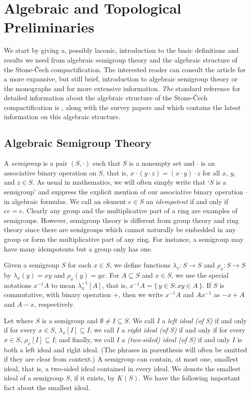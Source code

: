 \documentclass[12pt]{article}
\theoremstyle{plain}
\theoremstyle{definition}
\begin{document}
\section{Algebraic and Topological Preliminaries}
We start by giving a, possibly laconic, introduction to the basic
definitions and results we need from algebraic semigroup theory and the
algebraic structure of the Stone-\v{C}ech compactification.
The interested reader can consult the article \cite{Hollings:2007uq}
for a more expansive, but still brief, introduction to algebraic
semigroup theory or the monographs \cite{Clifford:1961fk} and
\cite{Clifford:1967fk} for more extensive information.
\textsl{The} standard reference for detailed information about the
algebraic structure of the Stone-\v{C}ech compactification is
\cite{Hindman:1998fk}, along with the survey papers \cite{Hindman:2002kx} and
\cite{Hindman:2010uq} which contains the latest information on this
algebraic structure. 

\subsection{Algebraic Semigroup Theory}
A \textsl{semigroup} is a pair $(S, \cdot)$ such that $S$ is a
nonempty set
and $\cdot$ is an associative binary operation on $S$, that is, $x \cdot
(y \cdot z) = (x \cdot y) \cdot z$ for all $x$, $y$, and $z \in S$.
As usual in mathematics, we will often simply write that `$S$ is a
semigroup' and suppress the explicit mention
of our associative binary operation $\cdot$ in algebraic formulas. 
We call an element $e \in S$ an \textsl{idempotent} if and only if $ee
= e$. 
Clearly any group and the multiplicative part of a ring are examples
of semigroups.
However, semigroup theory is different from group theory and ring
theory since there are semigroups which cannot naturally be embedded
in any group or form the multiplicative part of any ring.
For instance, a semigroup may have many idempotents but a group only
has one.

Given a semigroup $S$ for each $x \in S$, we define functions
$\lambda_x \colon S \to S$ and $\rho_x \colon S \to S$ by
$\lambda_x(y) = xy$ and $\rho_x(y) = yx$. 
For $A \subseteq S$ and $x \in S$, we use the special notations
$x^{-1}A$ to mean $\lambda_x^{-1}[A]$, that is, $x^{-1}A = \{\, y \in
S : xy \in A \,\}$. 
If $S$ is commutative, with binary operation $+$, then we write
$x^{-1}A$ and $Ax^{-1}$ as $-x+A$ and $A -x$, respectively.


Let where $S$ is a semigroup and $\emptyset \ne I \subseteq S$. 
We call $I$ a \textsl{left ideal (of S)} if and only if for every $x
\in S$, $\lambda_x[I] \subseteq I$; we call $I$ a \textsl{right ideal
  (of S)} if and only if for every $x \in S$, $\rho_x[I] \subseteq
I$; and finally, we call $I$ a \textsl{(two-sided) ideal (of S)} if
and only $I$ is both a left ideal and right ideal. 
(The phrases in parenthesis will often be omitted if they are clear
from context.)
A semigroup can contain, at most one, smallest ideal, that is, a
two-sided ideal contained in every ideal.
We denote the smallest ideal of a semigroup $S$, if it exists, by
$K(S)$. 
We have the following important fact about the smallest ideal.
\end{document}
